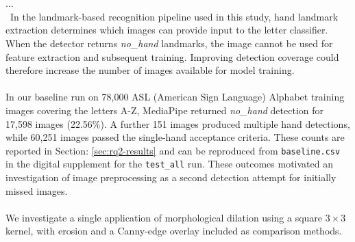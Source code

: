 \documentclass{article}
\begin{document}
\leavevmode \\\\
...
\\\
In the landmark-based recognition pipeline used in this study, hand landmark extraction determines which images can provide input to the letter classifier. When the detector returns \textit{no\_hand} landmarks, the image cannot be used for feature extraction and subsequent training. Improving detection coverage could therefore increase the number of images available for model training.
\\\\
In our baseline run on 78,000 ASL (American Sign Language) Alphabet training images covering the letters A-Z, MediaPipe returned \textit{no\_hand} detection for 17,598 images (22.56\%). A further 151 images produced multiple hand detections, while 60,251 images passed the single-hand acceptance criteria. These counts are reported in Section: \ref{sec:rq2-results}  and can be reproduced from \texttt{baseline.csv} in the digital supplement for the \texttt{test\_all} run. These outcomes motivated an investigation of image preprocessing as a second detection attempt for initially missed images.
\\\\
We investigate a single application of morphological dilation using a square \(3 \times 3\) kernel, with erosion and a Canny-edge overlay included as comparison methods. 




\end{document}
